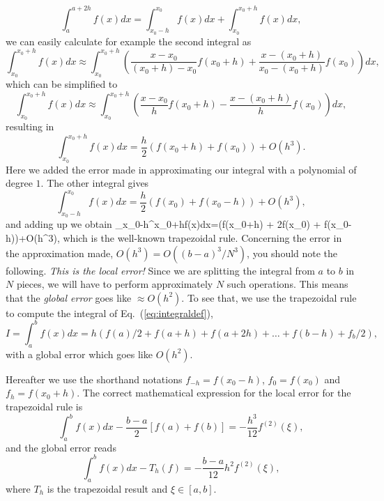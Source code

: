 \[
   \int_a^{a+2h}f(x)dx=\int_{x_0-h}^{x_0}f(x)dx+\int_{x_0}^{x_0+h}f(x)dx,
\]
we can easily calculate for example the second integral as
\[
\int_{x_0}^{x_0+h}f(x)dx\approx \int_{x_0}^{x_0+h}\left(\frac{x-x_0}{(x_0+h)-x_0}f(x_0+h)+\frac{x-(x_0+h)}{x_0-(x_0+h)}f(x_0)\right)dx,
\]
which can be simplified to
\[
\int_{x_0}^{x_0+h}f(x)dx\approx \int_{x_0}^{x_0+h}\left(\frac{x-x_0}{h}f(x_0+h)-\frac{x-(x_0+h)}{h}f(x_0)\right)dx,
\]
resulting in
\[
\int_{x_0}^{x_0+h}f(x)dx=\frac{h}{2}\left(f(x_0+h) + f(x_0)\right)+O(h^3).
\]
Here we added the error made in approximating our integral 
with a polynomial of degree $1$.
The other integral gives
\[
\int_{x_0-h}^{x_0}f(x)dx=\frac{h}{2}\left(f(x_0) + f(x_0-h)\right)+O(h^3),
\]
and adding up we obtain
\be
   \int_{x_0-h}^{x_0+h}f(x)dx=\left(f(x_0+h) + 2f(x_0) + f(x_0-h)\right)+O(h^3),
   \label{eq:trapez}
\ee
which is the well-known trapezoidal rule.  Concerning the error in the approximation made,
$O(h^3)=O((b-a)^3/N^3)$, you should  note 
the following.   {\em This is the local error!} Since we are splitting the integral from
$a$ to $b$ in $N$ pieces, we will have to perform approximately $N$ 
such operations.
This means that the {\em global error} goes like $\approx O(h^2)$. 
To see that, we use
the trapezoidal rule to compute
the integral     of Eq.\ (\ref{eq:integraldef}), 
\begin{equation}
   I=\int_a^bf(x) dx=h\left(f(a)/2 + f(a+h) +f(a+2h)+
                          \dots +f(b-h)+ f_{b}/2\right),
   \label{eq:trapez1}
\end{equation}
with a global error which goes like $O(h^2)$. 

Hereafter we use the shorthand notations $f_{-h}=f(x_0-h)$, $f_{0}=f(x_0)$
and $f_{h}=f(x_0+h)$.
  The correct mathematical expression for the local error for the trapezoidal rule is
\[
\int_a^bf(x)dx -\frac{b-a}{2}\left[f(a)+f(b)\right]=-\frac{h^3}{12}f^{(2)}(\xi),
\]
and the global error reads
\[
\int_a^bf(x)dx -T_h(f)=-\frac{b-a}{12}h^2f^{(2)}(\xi),
\]
where $T_h$ is the trapezoidal result and $\xi \in [a,b]$.

